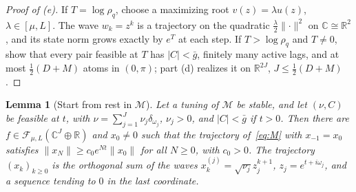 \documentclass[11pt]{article}
\newtheorem{lemma}[theorem]{Lemma}
\theoremstyle{definition}
\theoremstyle{remark}
\newcommand{\R}{\mathbb R}
\newcommand{\C}{\mathbb C}
\newcommand{\cF}{\mathcal F}
\newcommand{\cM}{\mathcal M}
\newcommand{\norm}[1]{\lVert #1\rVert}
\begin{document}
\begin{proof}[Proof of (e)]
If \(T=\log\rho_q\), choose a maximizing root
\(v(z)=\lambda u(z)\), \(\lambda\in[\mu,L]\).
The wave \(w_k=z^k\) is a trajectory on the quadratic
\(\frac\lambda2\norm\cdot^2\) on \(\C\cong\R^2\), and its state
norm grows exactly by \(e^T\) at each step.  If \(T>\log\rho_q\) and \(T\ne0\), 
show that every pair feasible at \(T\) has \(|C|<\bar g\), finitely many active lags, and
at most \(\frac12(D+M)\) atoms in \((0,\pi)\); part (d) realizes it on \(\R^{2J}\), \(J\le\frac12(D+M)\).
\end{proof}

\begin{lemma}[Start from rest in \(\cM\)]\label{lem:startup}
Let a tuning of \(\cM\) be stable, and let \((\nu,C)\) be feasible at \(t\), with
\(\nu=\sum_{j=1}^J\nu_j\delta_{\omega_j}\), \(\nu_j>0\), and \(|C|<\bar g\) if \(t>0\).
Then there are \(f\in\cF_{\mu,L}(\C^J\oplus\R)\) and \(x_0\ne0\) such that the
trajectory of~\eqref{eq:M} with \(x_{-1}=x_0\) satisfies
\(\norm{x_N}\ge c_0e^{Nt}\norm{x_0}\) for all \(N\ge0\), with \(c_0>0\).  The
trajectory \((x_k)_{k\ge0}\) is the orthogonal sum of the waves
\(x_k^{(j)}=\sqrt{\nu_j}z_j^{k+1}\), \(z_j=e^{t+i\omega_j}\), and a sequence tending
to \(0\) in the last coordinate.
\end{lemma}
\end{document}
